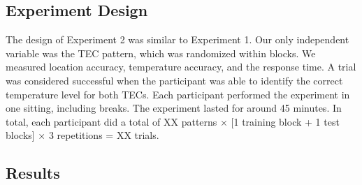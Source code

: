 \documentclass[preprint,12pt]{elsarticle}
\begin{document}
\subsection{Experiment Design}
The design of Experiment 2 was similar to Experiment 1. Our only independent variable was the TEC pattern, which was randomized within blocks. We measured location accuracy, temperature accuracy, and the response time. A trial was considered successful when the participant was able to identify the correct temperature level for both TECs. Each participant performed the experiment in one sitting, including breaks. The experiment lasted for around 45 minutes. In total, each participant did a total of XX patterns $\times$ [1 training block + 1 test blocks] $\times$ 3 repetitions = XX trials.


\subsection{Results}

\end{document}
